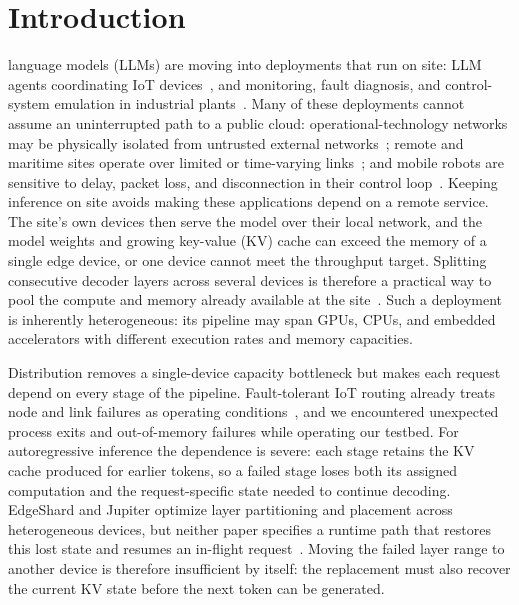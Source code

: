 \section{Introduction}\label{sec:intro}

 language models (LLMs) are moving into deployments
that run on site: LLM agents coordinating IoT devices~\cite{zhong2024casit},
and monitoring, fault diagnosis, and control-system emulation in industrial
plants~\cite{wang2024largescale,liu2024joint,chamotra2026advancing}.  Many of
these deployments cannot assume an uninterrupted path to a public cloud:
operational-technology networks may be physically isolated from untrusted
external networks~\cite{hussain2025airgap}; remote and maritime sites operate over
limited or time-varying links~\cite{yuan2023elect,yang2024erocn}; and mobile
robots are sensitive to delay, packet loss, and disconnection in their control
loop~\cite{omena2023twotier}.  Keeping inference on site avoids making these
applications depend on a remote service.  The site's own devices then serve
the model over their local network, and the model weights and growing
key-value (KV) cache can exceed the memory of a single edge device, or one device cannot meet
the throughput target.  Splitting consecutive
decoder layers across several devices is therefore a practical way to pool
the compute and memory already available at the site~\cite{macario2025mdi,
zhang2024edgeshard,ye2025jupiter,picano2025matching,zheng2026dybap}.  Such a deployment is inherently
heterogeneous: its pipeline may span GPUs, CPUs, and embedded accelerators
with different execution rates and memory capacities.

Distribution removes a single-device capacity bottleneck but makes each
request depend on every stage of the pipeline.  Fault-tolerant IoT routing
already treats node and link failures as operating
conditions~\cite{kaur2023intelligent}, and we encountered unexpected process
exits and out-of-memory failures while operating our testbed.  For
autoregressive inference the dependence is severe: each stage retains the KV
cache produced for earlier tokens, so a failed stage loses both its assigned
computation and the request-specific state needed to continue decoding.  EdgeShard and Jupiter optimize layer
partitioning and placement across heterogeneous devices, but neither paper
specifies a runtime path that restores this lost state and resumes an in-flight
request~\cite{zhang2024edgeshard,ye2025jupiter}.  Moving the failed layer range
to another device is therefore insufficient by itself: the replacement must
also recover the current KV state before the next token can be generated.

